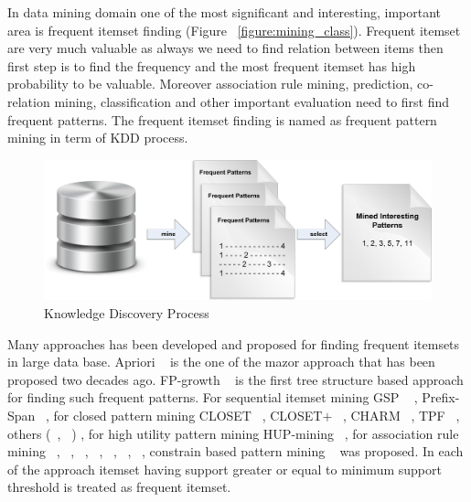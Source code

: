 In data mining domain one of the most significant and interesting, important area is frequent itemset finding (Figure ~\ref{figure:mining_class}). Frequent itemset are very much valuable as always we need to find relation between items then first step is to find the frequency and the most frequent itemset has high probability to be valuable. Moreover association rule mining, prediction, co-relation mining, classification and other important evaluation need to first find frequent patterns. The frequent itemset finding is named as frequent pattern mining in term of KDD process.\\
\begin{figure}
\centering
  \includegraphics[width=.9\textwidth]{images/frequent_flow.jpg}
\caption{Knowledge Discovery Process}
\label{figure:frequent_flow}
\end{figure}
Many approaches has been developed and proposed for finding frequent itemsets in large data base. Apriori ~\cite{apriori} is the one of the mazor approach that has been proposed two decades ago. FP-growth ~\cite{fp_growth} is the first tree structure based approach for finding such frequent patterns. For sequential itemset mining GSP ~\cite{gsp} , Prefix-Span ~\cite{prefix_span}, for closed pattern mining CLOSET ~\cite{closet}, CLOSET$+$ ~\cite{closet_plus}, CHARM ~\cite{charm}, TPF ~\cite{tpf}, others (~\cite{close_1}, ~\cite{close_2}) , for high utility pattern mining HUP-mining ~\cite{hup_mining}, for association rule mining ~\cite{ass_01}, ~\cite{ass_02}, ~\cite{ass_03}, ~\cite{ass_04}, ~\cite{ass_05}, ~\cite{ass_06}, ~\cite{ass_07}, constrain based pattern mining ~\cite{const_01} was proposed. In each of the approach itemset having support greater or equal to minimum support threshold is treated as frequent itemset.

